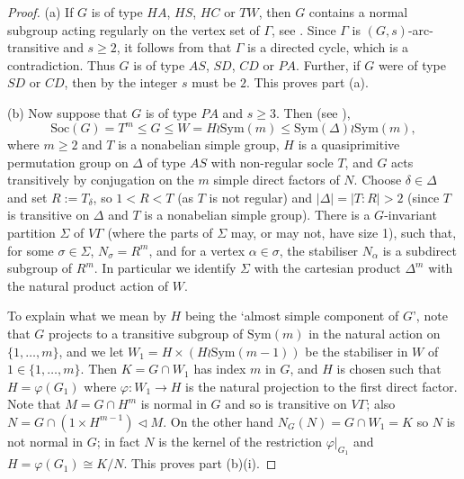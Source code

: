 \documentclass[11pt]{amsart}
\newtheorem{question}{Question}
\newcommand{\Soc}{\mathrm{Soc}}
\newcommand{\Sym}{\mathrm{Sym}}
\begin{document}

\begin{proof}
(a) If \(G\) is of type \(HA\), \(HS\), \(HC\) or \(TW\), then \(G\) contains a normal subgroup acting regularly on the vertex set of \(\Gamma\), see \cite[Section 5]{BCC97}. Since \(\Gamma\) is \((G,s)\)-arc-transitive and \(s\geqslant2\), it follows from \cite[Theorem 3.1]{Praeger} that \(\Gamma\) is a directed cycle, which is a contradiction.
Thus \(G\) is of type \(AS\), \(SD\), \(CD\) or \(PA\).
Further, if $G$ were of type \(SD\) or \(CD\), then by \cite[Theorem 1.2, Corollary 1.4]{quasi} the integer $s$ must be $2$. This proves part (a).

(b) Now suppose that \(G\) is of type \(PA\) and $s\geqslant3$. Then (see \cite[End of Section 5]{BCC97}), 
\[
\Soc(G)=T^m\leqslant G \leqslant W=H\wr \Sym(m) \leqslant \Sym(\Delta)\wr \Sym(m),
\]
where $m\geqslant 2$ and $T$ is a nonabelian simple group, $H$ is a quasiprimitive permutation group on $\Delta$ of type $AS$ with non-regular socle $T$, and $G$ acts transitively by conjugation on the $m$ simple direct factors of $N$. Choose $\delta\in\Delta$ and set $R:=T_\delta$, so $1<R<T$ (as $T$ is not regular) and $|\Delta|=|T:R|>2$ (since $T$ is transitive on $\Delta$ and $T$ is  a nonabelian simple group). There is a $G$-invariant partition $\Sigma$ of $V\Gamma$ (where the parts of $\Sigma$ may, or may not, have size 1), such that, for some $\sigma \in \Sigma$, $N_\sigma = R^m$, and for a vertex $\alpha \in \sigma$, the stabiliser $N_\alpha$ is a subdirect subgroup of $R^m$. 
In particular we identify $\Sigma$ with the cartesian product $\Delta^m$ with the natural product action of $W$. 

To explain what we mean by $H$ being the `almost simple component of $G$', note that \(G\) projects to a transitive subgroup of \(\Sym(m)\) in the natural action on \(\{1,\ldots,m\}\), and we let \(W_{1}=H\times (H\wr\Sym(m-1))\) be the stabiliser in \(W\) of \(1\in\{1,\ldots,m\}\). Then \(K=G\cap W_{1}\) has index $m$ in $G$, and $H$ is chosen such that $H=\varphi(G_1)$ where \(\varphi:W_1\to H\) is the natural projection to the first direct factor. Note that $M=G\cap H^m$ is normal in $G$ and so is transitive on $V\Gamma$; also $N= G\cap (1\times H^{m-1})\lhd M$. On the other hand $N_G(N) = G\cap W_1=K$ so $N$ is not normal in $G$; in fact $N$ is the kernel of the restriction $\varphi|_{G_1}$ and $H=\varphi(G_1)\cong K/N$. This proves part (b)(i). 



\end{proof}
\end{document}
